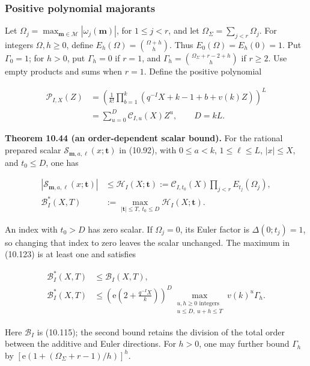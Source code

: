 \documentclass[
  11pt,
  a4paper,
]{article}
\begin{document}
\subsubsection{Positive polynomial
majorants}\label{positive-polynomial-majorants}

Let
\(\Omega_j=\max_{\boldsymbol m\in\mathcal M}|\omega_j(\boldsymbol m)|\),
for \(1\le j<r\), and let \(\Omega_\Sigma=\sum_{j<r}\Omega_j\). For
integers \(\Omega,h\ge0\), define \(E_h(\Omega)=\binom{\Omega+h}{h}\).
Thus \(E_0(\Omega)=E_h(0)=1\). Put \(\Gamma_0=1\); for \(h>0\), put
\(\Gamma_h=0\) if \(r=1\), and
\(\Gamma_h=\binom{\Omega_\Sigma+r-2+h}{h}\) if \(r\ge2\). Use empty
products and sums when \(r=1\). Define the positive polynomial

\[
\begin{aligned}
\mathcal P_{I,X}(Z)
&=\left(\frac1{k!}\prod_{b=1}^k
(q^{-I}X+k-1+b+v(k)Z)\right)^L\\
&=\sum_{u=0}^{D}\mathcal C_{I,u}(X)Z^u,
\qquad D=kL.
\end{aligned}
\tag{10.122}
\]

\textbf{Theorem 10.44 (an order-dependent scalar bound).} For the
rational prepared scalar
\(\mathcal S_{\boldsymbol m,a,\ell}(x;\boldsymbol t)\) in (10.92), with
\(0\le a<k\), \(1\le\ell\le L\), \(|x|\le X\), and \(t_0\le D\), one has

\[
\begin{aligned}
|\mathcal S_{\boldsymbol m,a,\ell}(x;\boldsymbol t)|
&\le\mathcal H_I(X;\boldsymbol t)
:=\mathcal C_{I,t_0}(X)\prod_{j<r}E_{t_j}(\Omega_j),\\
\mathcal B_I^*(X,T)
&:=\max_{|\boldsymbol t|\le T,\ t_0\le D}
\mathcal H_I(X;\boldsymbol t).
\end{aligned}
\tag{10.123}
\]

An index with \(t_0>D\) has zero scalar. If \(\Omega_j=0\), its Euler
factor is \(\Delta(0;t_j)=1\), so changing that index to zero leaves the
scalar unchanged. The maximum in (10.123) is at least one and satisfies

\[
\begin{aligned}
\mathcal B_I^*(X,T)&\le\mathcal B_I(X,T),\\
\mathcal B_I^*(X,T)&\le
\left(\mathrm e\left(2+\frac{q^{-I}X}{k}\right)\right)^D
\max_{\substack{u,h\ge0\text{ integers}\\u\le D,\ u+h\le T}}
v(k)^u\Gamma_h.
\end{aligned}
\tag{10.124}
\]

Here \(\mathcal B_I\) is (10.115); the second bound retains the division
of the total order between the additive and Euler directions. For
\(h>0\), one may further bound \(\Gamma_h\) by
\([\mathrm e(1+(\Omega_\Sigma+r-1)/h)]^h\).
\end{document}
